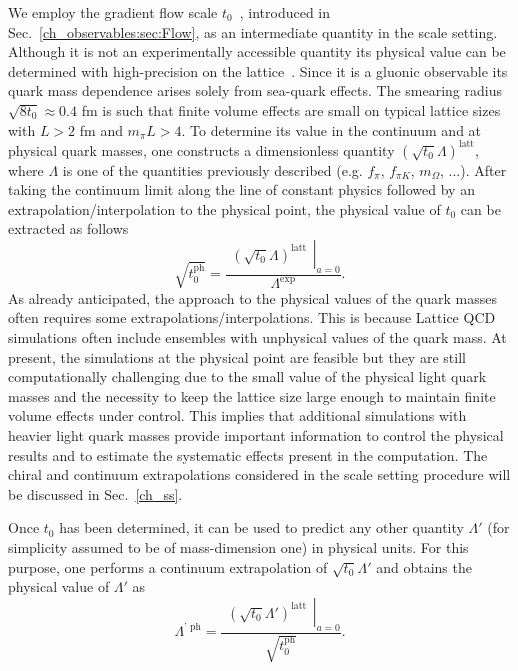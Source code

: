 We employ the gradient flow scale $t_0$~\citep{Luscher:2010we,1006.4518}, introduced in Sec.~\ref{ch_observables:sec:Flow}, as an intermediate quantity in the scale setting. Although it is not an experimentally accessible quantity its physical value can be determined with high-precision on the lattice~\citep{Bruno:2016plf,Strassberger:2023xnj,RQCD_scale,Kostrzewa:2021syw,Hollwieser:2020qri,MILC:2015tqx}. Since it is a gluonic observable its quark mass dependence arises solely from sea-quark effects. The smearing radius $\sqrt{8t_0} \approx 0.4$ fm  is such that finite volume effects are small on typical lattice sizes with $L > 2$ fm and $m_{\pi} L > 4$. To determine its value in the continuum and at physical quark masses, one constructs a dimensionless quantity $(\sqrt{t_0}\Lambda)^{\textrm{latt}}$, where $\Lambda$ is one of the quantities previously described (e.g. $f_{\pi}$, $f_{\pi K}$, $m_{\Omega}$, ...). After taking the continuum limit along the line of constant physics followed by an extrapolation/interpolation to the physical point, the physical value of $t_0$ can be extracted as follows
\begin{equation}
\label{ch_foundation:eq:Lambda}
\sqrt{t_0^{\textrm{ph}}}=\frac{\left.\begin{matrix}
\left(\sqrt{t_0}\Lambda\right)^{\textrm{latt}}
\end{matrix}\right|_{a=0}}{\Lambda^{\textrm{exp}}}.
\end{equation}
As already anticipated, the approach to the physical values of the quark masses often requires some extrapolations/interpolations. This is because Lattice QCD simulations often include ensembles with unphysical values of the quark mass. At present, the simulations at the physical point are feasible but they are still computationally challenging due to the small value of the physical light quark masses and the necessity to keep the lattice size large enough to maintain finite volume effects under control. This implies that additional simulations with heavier light quark masses provide important information to control the physical results and to estimate the systematic effects present in the computation. The chiral and continuum extrapolations considered in the scale setting procedure will be discussed in Sec.~\ref{ch_ss}.

Once $t_0$ has been determined, it can be used to predict any other quantity $\Lambda'$ (for simplicity assumed to be of mass-dimension one) in physical units. For this purpose, one performs a continuum extrapolation of $\sqrt{t_0}\Lambda'$ and obtains the physical value of $\Lambda'$ as
\begin{equation}
\Lambda^{\textrm{' ph}}=\frac{\left.\begin{matrix}
\left(\sqrt{t_0}\Lambda'\right)^{\textrm{latt}}
\end{matrix}\right|_{a=0}}{\sqrt{t_0^{\textrm{ph}}}}.
\end{equation}

